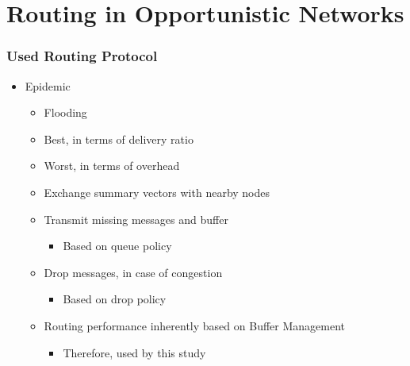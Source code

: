 \section{Routing in Opportunistic Networks}


\begin{frame}
  \frametitle{Used Routing Protocol}  
  \begin{itemize}
    \item Epidemic
    \vspace{0.3cm}
    \begin{itemize}
      \item Flooding
      \vspace{0.1cm}
      \item Best, in terms of delivery ratio
      \vspace{0.1cm}
      \item Worst, in terms of overhead
      \vspace{0.1cm}
      \item Exchange summary vectors with nearby nodes
      \vspace{0.1cm}
      \item Transmit missing messages and buffer
      \begin{itemize}
      	\item Based on queue policy
      \end{itemize}
      \vspace{0.1cm}
      \item Drop messages, in case of congestion
      \begin{itemize}
      	\item Based on drop policy
      \end{itemize}
      \vspace{0.1cm}
      \item Routing performance inherently based on Buffer Management
      \begin{itemize}
      	\item Therefore, used by this study
      \end{itemize}
    \end{itemize}
  \end{itemize}
\end{frame}



